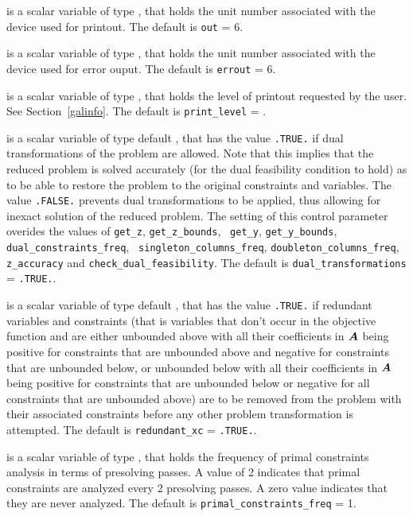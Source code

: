 \documentclass{galahad}
\newcommand{\sym}{\tt\small}
\begin{document}
\begin{description}
 is a scalar variable of type \integer, that holds the
unit number associated with the device used for printout.
The default is {\tt out} = 6.

 is a scalar variable of type \integer, that holds the
unit number associated with the device used for error ouput.
The default is {\tt errout} = 6.

 is a scalar variable of type \integer, that holds the
level of printout requested by the user. See Section~\ref{galinfo}.
The default is {\tt print\_level} = {\sym \galsymsilent}.

 is a scalar variable of type default \logical,
that has the value {\tt .TRUE.} if dual transformations of the problem are
allowed. Note that this implies that the reduced problem is solved
accurately (for the dual feasibility condition to hold)
as to be able to restore the problem to the original
constraints and variables. The value {\tt .FALSE.} prevents dual
transformations to be applied, thus allowing for inexact
solution of the reduced problem. The setting of this control
parameter overides the values of {\tt get\_z}, {\tt get\_z\_bounds}, {\tt
get\_y}, {\tt get\_y\_bounds}, {\tt dual\_constraints\_freq}, {\tt
singleton\_columns\_freq}, {\tt doubleton\_columns\_freq}, {\tt z\_accuracy}
and {\tt  check\_dual\_feasibility}.
The default is {\tt dual\_transformations} = {\tt .TRUE.}.

 is a scalar variable of type default \logical,
that has the value {\tt .TRUE.} if redundant variables and constraints
(that is variables that don't occur in the objective function and are
either unbounded above with all their coefficients in ${\bm{A}}$
being positive for constraints that are unbounded above and negative for
constraints that are unbounded below, or unbounded below
with all their coefficients in ${\bm{A}}$ being positive for constraints that are
unbounded below or negative for all constraints that are unbounded above)
are to be removed from the problem with their associated constraints before
any other problem transformation is attempted.
The default is {\tt redundant\_xc} = {\tt .TRUE.}.

 is a scalar variable of type \integer,
that holds the  frequency of primal constraints analysis in terms of
presolving passes.  A value of 2 indicates that primal
constraints are analyzed every 2 presolving passes. A zero
value indicates that they are never analyzed.
The default is {\tt primal\_constraints\_freq} = 1.


\end{description}
\end{document}
